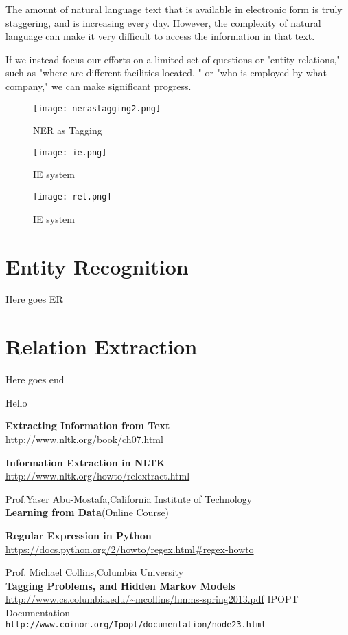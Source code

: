\documentclass[12pt]{report}
\begin{document}
The amount of natural language text that is available in electronic 
form is truly staggering, and is increasing every day. 
However, 
the complexity of natural language can make it very difficult to access the information in that text\cite{BookIE}.\\

\par If we instead focus our efforts on a limited set of questions or 
"entity relations," such as "where are different facilities located,
" or "who is employed by what company," we can make significant progress.\cite{BookIE}
\begin{figure}[htp]
\centering
\texttt{[image: nerastagging2.png]}
\caption{NER as Tagging}
\label{NERasT}
\end{figure}

\begin{figure}[htp]
\centering
\texttt{[image: ie.png]}
\caption{IE system}
\label{IE}
\end{figure}

\begin{figure}[htp]
\centering
\texttt{[image: rel.png]}
\caption{IE system}
\label{IE}
\end{figure}


\chapter{Entity Recognition}
\par Here goes ER

\chapter{Relation Extraction}
\par Here goes end\par Hello

\begin{thebibliography}{99}
\textbf{Extracting Information from Text}\\
\url{http://www.nltk.org/book/ch07.html}

\textbf{Information Extraction in NLTK}\\
\url{http://www.nltk.org/howto/relextract.html}

Prof.Yaser Abu-Mostafa,California Institute of Technology\\
\textbf{Learning from Data}(Online Course)

\textbf{Regular Expression in Python}\\
\url{https://docs.python.org/2/howto/regex.html#regex-howto}

Prof. Michael Collins,Columbia University\\
\textbf{Tagging Problems, and Hidden Markov Models}\\
\url{http://www.cs.columbia.edu/~mcollins/hmms-spring2013.pdf}
IPOPT Documentation\\
\texttt{http://www.coinor.org/Ipopt/documentation/node23.html}

\end{thebibliography}
\end{document}
